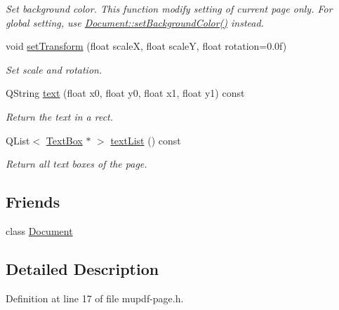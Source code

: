 \begin{DoxyCompactItemize}
\begin{DoxyCompactList}\small\item\em Set background color. This function modify setting of current page only. For global setting, use \hyperlink{class_mu_p_d_f_1_1_document_a0b9669def894d9164543e3367ae11d21}{Document\-::set\-Background\-Color()} instead. \end{DoxyCompactList}\item 
void \hyperlink{class_mu_p_d_f_1_1_page_a366b4f46b6f83a45afda029c81ca4d15}{set\-Transform} (float scale\-X, float scale\-Y, float rotation=0.\-0f)
\begin{DoxyCompactList}\small\item\em Set scale and rotation. \end{DoxyCompactList}\item 
Q\-String \hyperlink{class_mu_p_d_f_1_1_page_a40d3c45ab4ad02a07c9af726f14c97f3}{text} (float x0, float y0, float x1, float y1) const 
\begin{DoxyCompactList}\small\item\em Return the text in a rect. \end{DoxyCompactList}\item 
Q\-List$<$ \hyperlink{class_mu_p_d_f_1_1_text_box}{Text\-Box} $\ast$ $>$ \hyperlink{class_mu_p_d_f_1_1_page_a357731345081db20d209685a50cca27a}{text\-List} () const 
\begin{DoxyCompactList}\small\item\em Return all text boxes of the page. \end{DoxyCompactList}\end{DoxyCompactItemize}
\subsection*{Friends}
\begin{DoxyCompactItemize}
\item 
class \hyperlink{class_mu_p_d_f_1_1_page_a883538034e58fc5c0de7d4e4cab3cef7}{Document}
\end{DoxyCompactItemize}


\subsection{Detailed Description}


Definition at line 17 of file mupdf-\/page.\-h.



